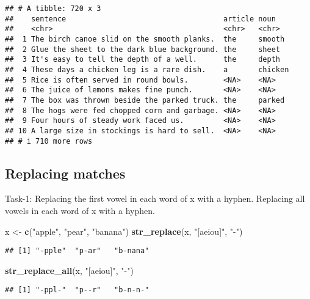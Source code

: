 \documentclass[
]{article}
\newenvironment{Shaded}{\begin{snugshade}}{\end{snugshade}}
\newcommand{\FunctionTok}[1]{\textcolor[rgb]{0.13,0.29,0.53}{\textbf{#1}}}
\newcommand{\NormalTok}[1]{#1}
\newcommand{\OtherTok}[1]{\textcolor[rgb]{0.56,0.35,0.01}{#1}}
\newcommand{\StringTok}[1]{\textcolor[rgb]{0.31,0.60,0.02}{#1}}
\begin{document}
\begin{verbatim}
## # A tibble: 720 x 3
##    sentence                                    article noun   
##    <chr>                                       <chr>   <chr>  
##  1 The birch canoe slid on the smooth planks.  the     smooth 
##  2 Glue the sheet to the dark blue background. the     sheet  
##  3 It's easy to tell the depth of a well.      the     depth  
##  4 These days a chicken leg is a rare dish.    a       chicken
##  5 Rice is often served in round bowls.        <NA>    <NA>   
##  6 The juice of lemons makes fine punch.       <NA>    <NA>   
##  7 The box was thrown beside the parked truck. the     parked 
##  8 The hogs were fed chopped corn and garbage. <NA>    <NA>   
##  9 Four hours of steady work faced us.         <NA>    <NA>   
## 10 A large size in stockings is hard to sell.  <NA>    <NA>   
## # i 710 more rows
\end{verbatim}

\hypertarget{replacing-matches}{%
\subsection{Replacing matches}\label{replacing-matches}}

Task-1: Replacing the first vowel in each word of x with a hyphen.
Replacing all vowels in each word of x with a hyphen.

\begin{Shaded}
\begin{Highlighting}[]
\NormalTok{x }\OtherTok{\textless{}{-}} \FunctionTok{c}\NormalTok{(}\StringTok{"apple"}\NormalTok{, }\StringTok{"pear"}\NormalTok{, }\StringTok{"banana"}\NormalTok{)}
\FunctionTok{str\_replace}\NormalTok{(x, }\StringTok{"[aeiou]"}\NormalTok{, }\StringTok{"{-}"}\NormalTok{)}
\end{Highlighting}
\end{Shaded}

\begin{verbatim}
## [1] "-pple"  "p-ar"   "b-nana"
\end{verbatim}

\begin{Shaded}
\begin{Highlighting}[]
\FunctionTok{str\_replace\_all}\NormalTok{(x, }\StringTok{"[aeiou]"}\NormalTok{, }\StringTok{"{-}"}\NormalTok{)}
\end{Highlighting}
\end{Shaded}

\begin{verbatim}
## [1] "-ppl-"  "p--r"   "b-n-n-"
\end{verbatim}
\end{document}
